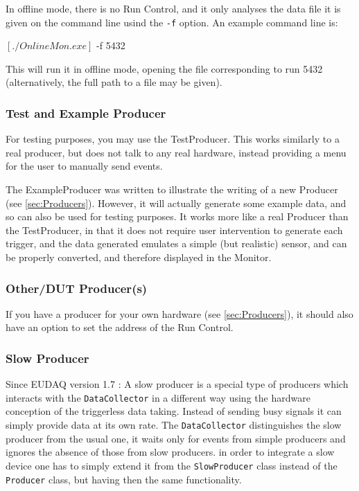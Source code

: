 In offline mode, there is no Run Control,
and it only analyses the data file it is given on the command line usind the \texttt{-f} option. 
An example command line is:
\begin{listing}[mybash]
$[./OnlineMon.exe]$ -f 5432
\end{listing}
This will run it in offline mode, opening the file corresponding to run 5432
(alternatively, the full path to a file may be given).

\subsubsection{Test and Example Producer}
For testing purposes, you may use the TestProducer.
This works similarly to a real producer, but does not talk to any real hardware,
instead providing a menu for the user to manually send events.

The ExampleProducer was written to illustrate the writing of a new Producer (see \autoref{sec:Producers}).
However, it will actually generate some example data, and so can also be used for testing purposes.
It works more like a real Producer than the TestProducer,
in that it does not require user intervention to generate each trigger,
and the data generated emulates a simple (but realistic) sensor,
and can be properly converted, and therefore displayed in the Monitor.

\subsubsection{Other/DUT Producer(s)}
If you have a producer for your own hardware (see \autoref{sec:Producers}),
it should also have an option to set the address of the Run Control.

\subsubsection{Slow Producer}
Since EUDAQ version 1.7 \cite{Shirokova:2016}: A slow producer is a special type of producers which interacts with the \texttt{DataCollector} in a different way using the hardware conception of the triggerless data taking. Instead of sending busy signals it can simply provide data at its own rate. The \texttt{DataCollector} distinguishes the slow producer from the usual one, it waits only for events from simple producers and ignores the absence of those from slow producers.
in order to integrate a slow device one has to simply extend it from the \texttt{SlowProducer} class instead of the \texttt{Producer} class, but having then the same functionality. 


